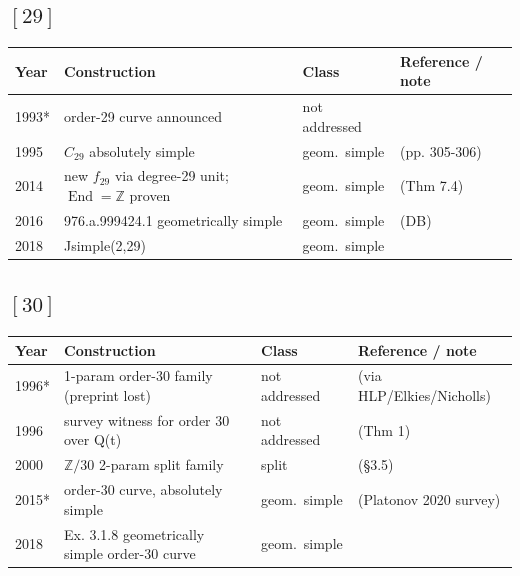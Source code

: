 \documentclass[10pt]{amsart}
\begin{document}
\subsection*{$[29]$}
\begin{longtable}{p{0.9cm} p{7.6cm} p{2.3cm} p{4.2cm}}
\hline Year & Construction & Class & Reference / note \\ \hline
1993* & order-29 curve announced & not addressed & \cite{Leprevost1993}\\
1995 & $C_{29}$ absolutely simple & geom.\ simple & \cite{Leprevost1995} (pp. 305-306)\\
2014 & new $f_{29}$ via degree-29 unit; $\operatorname{End}=\mathbb{Z}$ proven & geom.\ simple & \cite{RMS2014} (Thm 7.4)\\
2016 & 976.a.999424.1 geometrically simple & geom.\ simple & \cite{BSSVY} (DB)\\
2018 & Jsimple(2,29) & geom.\ simple & \cite{Nicholls2018}\\
\hline\end{longtable}
\subsection*{$[30]$}
\begin{longtable}{p{0.9cm} p{7.6cm} p{2.3cm} p{4.2cm}}
\hline Year & Construction & Class & Reference / note \\ \hline
1996* & 1-param order-30 family (preprint lost) & not addressed & \cite{LeprevostUnpub1996} (via HLP/Elkies/Nicholls)\\
1996 & survey witness for order 30 over Q(t) & not addressed & \cite{Poonen1996} (Thm 1)\\
2000 & $\mathbb{Z}/30$ 2-param split family & split & \cite{HLP2000} (\S3.5)\\
2015* & order-30 curve, absolutely simple & geom.\ simple & \cite{PP2015} (Platonov 2020 survey)\\
2018 & Ex. 3.1.8 geometrically simple order-30 curve & geom.\ simple & \cite{Nicholls2018}\\
\hline\end{longtable}
\end{document}
